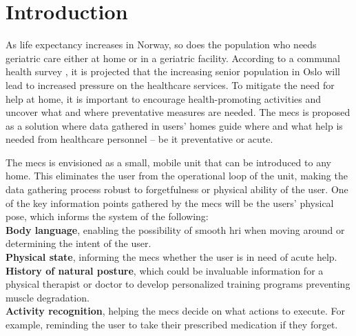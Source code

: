 \chapter{Introduction}




As life expectancy increases in Norway, so does the population who needs geriatric care either at home or in a geriatric facility. According to a communal health survey \cite{oslohelsa}, it is projected that the increasing senior population in Oslo will lead to increased pressure on the healthcare services. To mitigate the need for help at home, it is important to encourage health-promoting activities and uncover what and where preventative measures are needed. The \gls{mecs} is proposed as a solution where data gathered in users' homes guide where and what help is needed from healthcare personnel -- be it preventative or acute.

The \gls{mecs} is envisioned as a small, mobile unit that can be introduced to any home. This eliminates the user from the operational loop of the unit, making the data gathering process robust to forgetfulness or physical ability of the user. One of the key information points gathered by the \gls{mecs} will be the users' physical pose, which informs the system of the following:\\
\textbf{Body language}, enabling the possibility of smooth \gls{hri} when moving around or determining the intent of the user.\\
\textbf{Physical state}, informing the \gls{mecs} whether the user is in need of acute help.\\
\textbf{History of natural posture}, which could be invaluable information for a physical therapist or doctor to develop personalized training programs preventing muscle degradation.\\
\textbf{Activity recognition}, helping the \gls{mecs} decide on what actions to execute. For example, reminding the user to take their prescribed medication if they forget.

